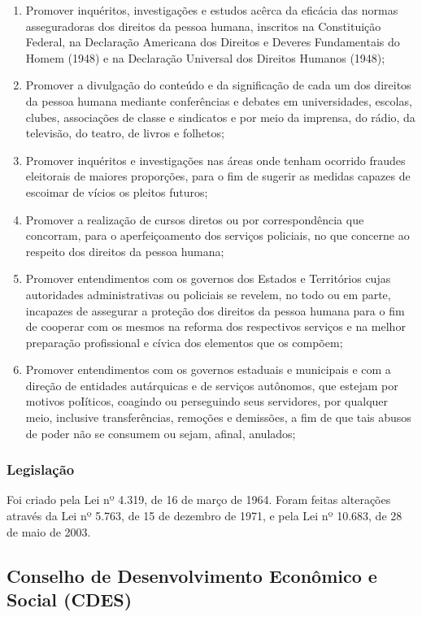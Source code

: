 \begin{enumerate}
\item 
Promover inquéritos, investigações e estudos acêrca da
eficácia das normas asseguradoras dos direitos da pessoa humana,
inscritos na Constituição Federal, na Declaração Americana
dos Direitos e Deveres Fundamentais do Homem (1948) e na
Declaração Universal dos Direitos Humanos (1948);
\item 
Promover a divulgação do conteúdo e da significação de
cada um dos direitos da pessoa humana mediante conferências e debates
em universidades, escolas, clubes, associações de classe e
sindicatos e por meio da imprensa, do rádio, da televisão, do
teatro, de livros e folhetos;
\item 
Promover inquéritos e investigações nas áreas onde tenham
ocorrido fraudes eleitorais de maiores proporções, para o fim de
sugerir as medidas capazes de escoimar de vícios os pleitos futuros;
\item 
Promover a realização de cursos diretos ou por correspondência
que concorram, para o aperfeiçoamento dos serviços policiais,
no que concerne ao respeito dos direitos da pessoa humana;
\item 
Promover entendimentos com os governos dos Estados e Territórios cujas
autoridades administrativas ou policiais se revelem, no todo ou em
parte, incapazes de assegurar a proteção dos direitos da pessoa
humana para o fim de cooperar com os mesmos na reforma dos respectivos
serviços e na melhor preparação profissional e cívica dos
elementos que os compõem;
\item 
Promover entendimentos com os governos estaduais e municipais e com a
direção de entidades autárquicas e de serviços autônomos,
que estejam por motivos poIíticos, coagindo ou perseguindo seus
servidores, por qualquer meio, inclusive transferências,
remoções e demissões, a fim de que tais abusos de poder não
se consumem ou sejam, afinal, anulados;
\end{enumerate}

\subsubsection*{Legislação}

Foi criado pela Lei nº 4.319, de 16 de março de
1964. Foram feitas alterações através da Lei
nº 5.763, de 15 de dezembro de 1971, e pela Lei
nº 10.683, de 28 de maio de 2003.
\newpage
\subsection*{Conselho de Desenvolvimento Econômico e Social (CDES)}

